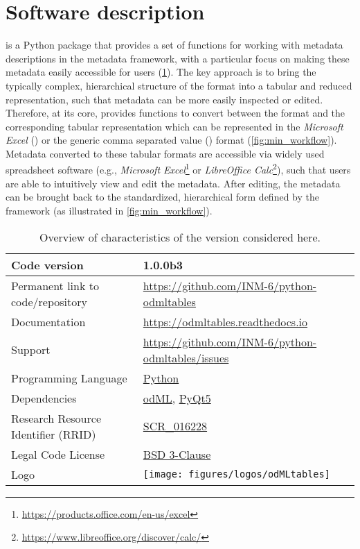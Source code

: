 \section{Software description}
\label{sec:Software}

 is a Python package that provides a set of functions for working with metadata descriptions in the  metadata framework, with a particular focus on making these metadata easily accessible for users (\cref{tab:odmltables_characteristics}). The key approach is to bring the typically complex, hierarchical structure of the  format into a tabular and reduced  representation, such that metadata can be more easily inspected or edited. Therefore, at its core,  provides functions to convert between the  format and the corresponding tabular representation which can be represented in the \textit{Microsoft Excel} () or the generic comma separated value () format (\cref{fig:min_workflow}). Metadata converted to these tabular formats are accessible via widely used spreadsheet software (e.g., \textit{Microsoft Excel}\footnote{\url{https://products.office.com/en-us/excel}} or \textit{LibreOffice Calc}\footnote{\url{https://www.libreoffice.org/discover/calc/}}), such that users are able to intuitively view and edit the metadata. After editing, the metadata can be brought back to the standardized, hierarchical form defined by the  framework (as illustrated in \cref{fig:min_workflow}).

\begin{table}
\small
\begin{tabular}{ll}
\hline
Code version & 1.0.0b3 \\
\hline
Permanent link to code/repository & \href{https://github.com/INM-6/python-odmltables}{https://github.com/INM-6/python-odmltables}\\
\hline
Documentation & \href{https://odmltables.readthedocs.io}{https://odmltables.readthedocs.io}\\
\hline
Support & \href{https://github.com/INM-6/python-odmltables/issues}{https://github.com/INM-6/python-odmltables/issues}\\
\hline
Programming Language & \href{https://www.python.org/}{Python}\\
\hline
Dependencies & \href{http://g-node.github.io/python-odml/}{odML}, \href{https://wiki.python.org/moin/PyQt}{PyQt5}\\  
\hline
Research Resource Identifier (RRID) & \href{https://scicrunch.org/scicrunch/Resources/record/nlx_144509-1/SCR_016228/resolver}{SCR\_016228}\\
\hline
Legal Code License  & \href{https://github.com/INM-6/python-odmltables/blob/master/LICENSE.txt}{BSD 3-Clause} \\
\hline
Logo &
\texttt{[image: figures/logos/odMLtables]}\\
\hline
\end{tabular}
\caption[Overview of  characteristics]{Overview of  characteristics of the version considered here.}
\label{tab:odmltables_characteristics}
\end{table}

